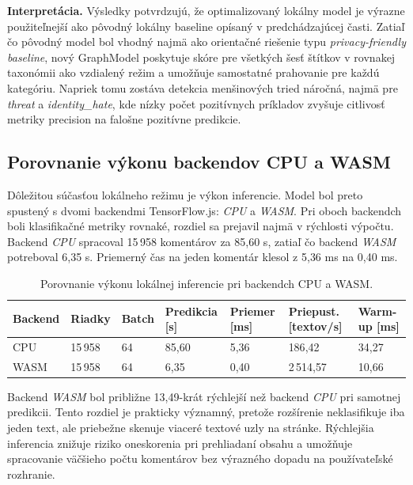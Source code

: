 \textbf{Interpretácia.} Výsledky potvrdzujú, že optimalizovaný lokálny model je výrazne použiteľnejší ako pôvodný lokálny baseline opísaný v predchádzajúcej časti. Zatiaľ čo pôvodný model bol vhodný najmä ako orientačné riešenie typu \emph{privacy-friendly baseline}, nový GraphModel poskytuje skóre pre všetkých šesť štítkov v rovnakej taxonómii ako vzdialený režim a umožňuje samostatné prahovanie pre každú kategóriu. Napriek tomu zostáva detekcia menšinových tried náročná, najmä pre \emph{threat} a \emph{identity\_hate}, kde nízky počet pozitívnych príkladov zvyšuje citlivosť metriky precision na falošne pozitívne predikcie.

\subsection{Porovnanie výkonu backendov CPU a WASM}
Dôležitou súčasťou lokálneho režimu je výkon inferencie. Model bol preto spustený s dvomi backendmi TensorFlow.js: \emph{CPU} a \emph{WASM}. Pri oboch backendch boli klasifikačné metriky rovnaké, rozdiel sa prejavil najmä v rýchlosti výpočtu. Backend \emph{CPU} spracoval 15\,958 komentárov za 85{,}60 s, zatiaľ čo backend \emph{WASM} potreboval 6{,}35 s. Priemerný čas na jeden komentár klesol z 5{,}36 ms na 0{,}40 ms.

\FloatBarrier
\begin{table}[!htbp]
  \centering
  \small
  \renewcommand{\arraystretch}{1.2}
  \setlength{\tabcolsep}{4pt}
  \begin{tabularx}{\textwidth}{|Y|Y|Y|Y|Y|Y|Y|}
    \hline
    \textbf{Backend} &
    \textbf{Riadky} &
    \textbf{Batch} &
    \textbf{Predikcia [s]} &
    \textbf{Priemer [ms]} &
    \textbf{Priepust. [textov/s]} &
    \textbf{Warm-up [ms]} \\
    \hline
    CPU &
    15\,958 &
    64 &
    85{,}60 &
    5{,}36 &
    186{,}42 &
    34{,}27 \\
    \hline
    WASM &
    15\,958 &
    64 &
    6{,}35 &
    0{,}40 &
    2\,514{,}57 &
    10{,}66 \\
    \hline
  \end{tabularx}
  \caption[Porovnanie CPU a WASM backendu]{Porovnanie výkonu lokálnej inferencie pri backendch CPU a WASM.}
  \label{tab:local_charcnn_backend_perf}
\end{table}
\FloatBarrier

Backend \emph{WASM} bol približne 13{,}49-krát rýchlejší než backend \emph{CPU} pri samotnej predikcii. Tento rozdiel je prakticky významný, pretože rozšírenie neklasifikuje iba jeden text, ale priebežne skenuje viaceré textové uzly na stránke. Rýchlejšia inferencia znižuje riziko oneskorenia pri prehliadaní obsahu a umožňuje spracovanie väčšieho počtu komentárov bez výrazného dopadu na používateľské rozhranie.

